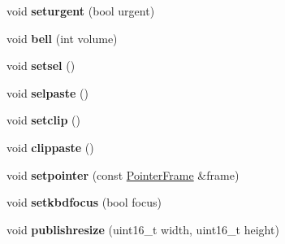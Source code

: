 \begin{DoxyCompactItemize}
void {\bfseries seturgent} (bool urgent)
\item 
\mbox{\label{classWlWindow_a0376d51827e68dda9e3a1aedae0c2990}} 
void {\bfseries bell} (int volume)
\item 
\mbox{\label{classWlWindow_a2c9e7e9177a72fe2bb821e3eed3c29ac}} 
void {\bfseries setsel} ()
\item 
\mbox{\label{classWlWindow_a6eebb5a4c90649dedd9ea4081473fcce}} 
void {\bfseries selpaste} ()
\item 
\mbox{\label{classWlWindow_a3a7db0a3be0b3a7bb4435ac395925840}} 
void {\bfseries setclip} ()
\item 
\mbox{\label{classWlWindow_af753c54fd945fcf2759194aab0fab237}} 
void {\bfseries clippaste} ()
\item 
\mbox{\label{classWlWindow_a1384cd3e989e60148f88febf1dd0dfeb}} 
void {\bfseries setpointer} (const \mbox{\hyperlink{structPointerFrame}{Pointer\+Frame}} \&frame)
\item 
\mbox{\label{classWlWindow_a0b29e92c168bb2353fb6c6b1e4dd0c47}} 
void {\bfseries setkbdfocus} (bool focus)
\item 
\mbox{\label{classWlWindow_aebb0beba7643f2c79226e4819ee1d3ba}} 
void {\bfseries publishresize} (uint16\+\_\+t width, uint16\+\_\+t height)
\end{DoxyCompactItemize}

